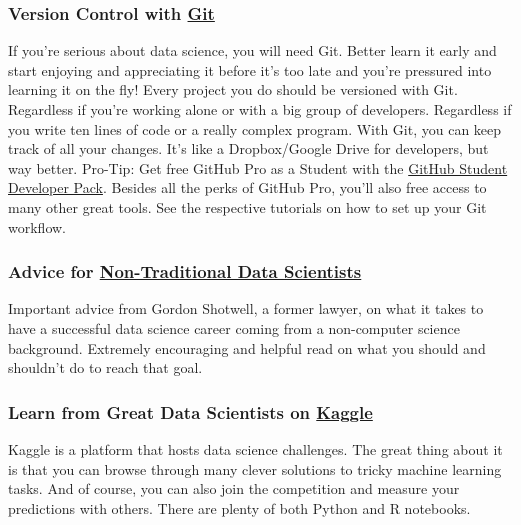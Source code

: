 \documentclass[
  11pt,
]{article}
\begin{document}
\hypertarget{version-control-with-git}{%
\subsubsection{\texorpdfstring{Version Control with \href{https://github.com/}{Git}}{Version Control with Git}}\label{version-control-with-git}}

If you're serious about data science, you will need Git. Better learn it early and start enjoying and appreciating it before it's too late and you're pressured into learning it on the fly! Every project you do should be versioned with Git. Regardless if you're working alone or with a big group of developers. Regardless if you write ten lines of code or a really complex program. With Git, you can keep track of all your changes. It's like a Dropbox/Google Drive for developers, but way better. Pro-Tip: Get free GitHub Pro as a Student with the \href{https://education.github.com/pack}{GitHub Student Developer Pack}. Besides all the perks of GitHub Pro, you'll also free access to many other great tools. See the respective tutorials on how to set up your Git workflow.

\hypertarget{advice-for-non-traditional-data-scientists}{%
\subsubsection{\texorpdfstring{Advice for \href{https://blog.shotwell.ca/posts/learning_data_science/}{Non-Traditional Data Scientists}}{Advice for Non-Traditional Data Scientists}}\label{advice-for-non-traditional-data-scientists}}

Important advice from Gordon Shotwell, a former lawyer, on what it takes to have a successful data science career coming from a non-computer science background. Extremely encouraging and helpful read on what you should and shouldn't do to reach that goal.

\hypertarget{learn-from-great-data-scientists-on-kaggle}{%
\subsubsection{\texorpdfstring{Learn from Great Data Scientists on \href{https://www.kaggle.com/}{Kaggle}}{Learn from Great Data Scientists on Kaggle}}\label{learn-from-great-data-scientists-on-kaggle}}

Kaggle is a platform that hosts data science challenges. The great thing about it is that you can browse through many clever solutions to tricky machine learning tasks. And of course, you can also join the competition and measure your predictions with others. There are plenty of both Python and R notebooks.
\end{document}
